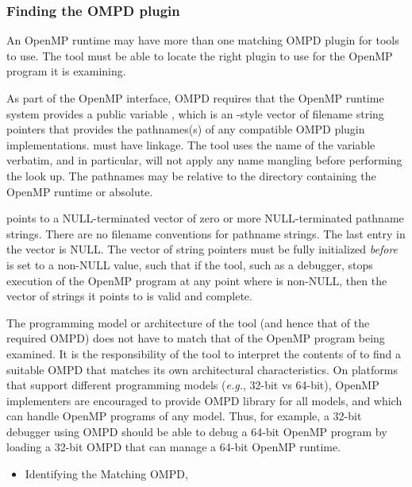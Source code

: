 \subsubsection{Finding the OMPD plugin}
\label{ompd:finding-the-ompd}

An OpenMP runtime may have more than one matching OMPD plugin for 
tools to use.
The tool must be able to locate the right plugin to use
for the OpenMP program it is examining.

As part of the OpenMP interface, OMPD requires that the OpenMP
runtime system provides a public variable ,
which is an -style vector of filename string pointers that
provides the pathnames(s) of any compatible OMPD plugin implementations.
 must have  linkage.
The tool uses the name of the variable verbatim,
and in particular, will not apply any name mangling before
performing the look up.
The pathnames may be relative to the directory containing the OpenMP runtime or absolute.

 points to a NULL-terminated
vector of zero or more NULL-terminated pathname strings.
There are no filename conventions for pathname strings.
The last entry in the vector is NULL.
The vector of string pointers must be fully initialized \emph{before}
 is set to a non-NULL value,
such that if the tool, such as a debugger,
stops execution of the OpenMP program at any point where
 is non-NULL,
then the vector of strings it points to is valid and complete.

The programming model or architecture of the tool (and hence
that of the required OMPD) does not have to match that of the OpenMP program
being examined.
It is the responsibility of the tool to interpret the contents
of  to find a suitable OMPD that matches
its own architectural characteristics.
On platforms that support different programming models
(\textit{e.g.}, 32-bit vs 64-bit), OpenMP implementers are encouraged
to provide OMPD library for all models, and which can handle
OpenMP programs of any model.
Thus, for example, a 32-bit debugger using OMPD should be able
to debug a 64-bit OpenMP program
by loading a 32-bit OMPD that can manage a 64-bit OpenMP runtime.

\crossreferences
\begin{itemize}
	\item Identifying the Matching OMPD, 
\end{itemize}

